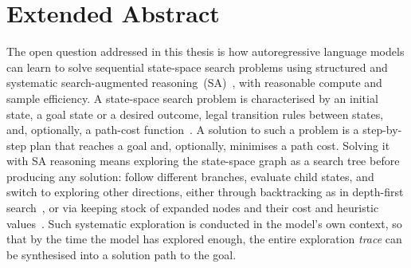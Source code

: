 \chapter{Extended Abstract}

The open question addressed in this thesis is how autoregressive language models can learn to solve sequential state-space search problems using structured and systematic search-augmented reasoning~(SA)~\citep{lehnertBetterPlanningTransformers2024}, with reasonable compute and sample efficiency.
A state-space search problem is characterised by an initial state, a goal state or a desired outcome, legal transition rules between states, and, optionally, a path-cost function~\citep{russel2010,newell1972human}.
A solution to such a problem is a step-by-step plan that reaches a goal and, optionally, minimises a path cost.
Solving it with SA reasoning means exploring the state-space graph as a search tree before producing any solution: follow different branches, evaluate child states, and switch to exploring other directions, either through backtracking as in depth-first search~\citep{russel2010}, or via keeping stock of expanded nodes and their cost and heuristic values~\citep{hartFormalBasisHeuristic1968}.
Such systematic exploration is conducted in the model's own context, so that by the time the model has explored enough, the entire exploration \emph{trace} can be synthesised into a solution path to the goal.

